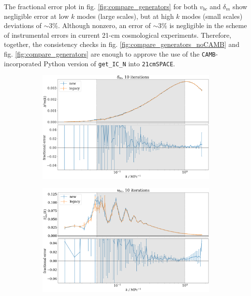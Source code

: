 \documentclass[floats,floatfix,showpacs,amssymb,prd,superscriptaddress,nofootinbib]{revtex4-2} %
\newcommand{\code}{\texttt}
\newcommand{\red}{\textcolor{red}}
\begin{document}
The fractional error plot in fig. \ref{fig:compare_generators} for both $v_{bc}$ and $\delta_m$ show negligible error at low $k$ modes (large scales), but at high $k$ modes (small scales) deviations of $\sim 3 \%$.
Although nonzero, an error of $\sim 3 \%$ is negligible in the scheme of instrumental errors in current 21-cm cosmological experiments. Therefore, together, the consistency checks in fig. \ref{fig:compare_generators_noCAMB} and fig. \ref{fig:compare_generators} are enough to approve the use of the \code{CAMB}-incorporated Python version of \code{get\_IC\_N} into \code{21cmSPACE}.

\newpage
\begin{figure}[H]
     \centering
     \begin{subfigure}[b]{0.9\textwidth}
         \centering
         \includegraphics[width=\textwidth]{images/ic_power_spectra/compare_generators_averaged_power_spectra_with_residual_noCAMB_delta_m.png}
         \label{fig:compare_generators_power_spectrum_noCAMB_delta_m}
     \end{subfigure}
     \hfill
     \begin{subfigure}[b]{0.9\textwidth}
         \centering
         \includegraphics[width=\textwidth]{images/ic_power_spectra/compare_generators_averaged_power_spectra_with_residual_noCAMB_v_bc.png}

\end{subfigure}
\end{figure}
\end{document}
